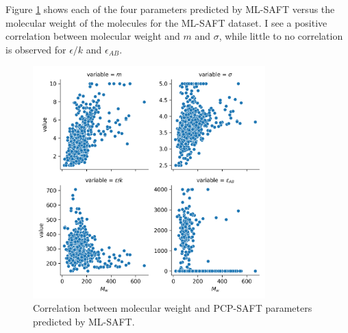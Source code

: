 Figure \ref{fig:molecular_weight} shows each of the four parameters predicted by ML-SAFT versus the molecular weight of the molecules for the ML-SAFT dataset. I see a positive correlation between molecular weight and $m$ and $\sigma$, while little to no correlation is observed for $\epsilon/k$ and $\epsilon_{AB}$.

\begin{figure}
    \centering
    \includegraphics[width=0.8\textwidth]{gfx/Chapter08/mw_pcsaft_parameter_correlation.png}
    \caption{Correlation between molecular weight and PCP-SAFT parameters predicted by ML-SAFT.}
    \label{fig:molecular_weight}
\end{figure}

